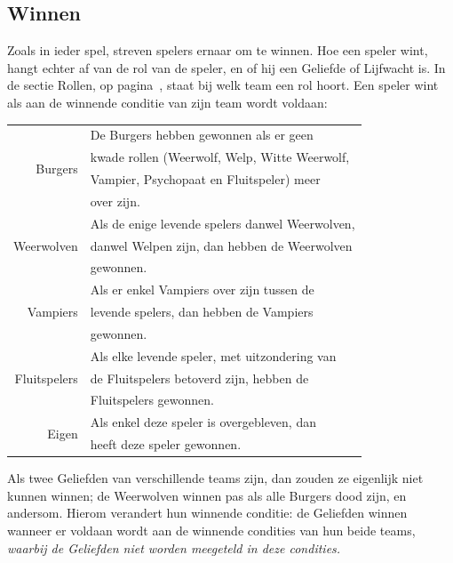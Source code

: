 \documentclass[12pt]{article}
\begin{document}
  \subsection{Winnen} \label{subsec:winnen}
  
    Zoals in ieder spel, streven spelers ernaar om te winnen. Hoe een speler wint, hangt echter af van de rol van de speler, en of hij een Geliefde of Lijfwacht is. In de sectie Rollen, op pagina~\pageref{subsec:rollen}, staat bij welk team een rol hoort. Een speler wint als aan de winnende conditie van zijn team wordt voldaan:
    
    \begin{center}
      \begin{tabular}{r|l}
	\multirow{4}{*}{Burgers}
	 & De Burgers hebben gewonnen als er geen \\
	 & kwade rollen (Weerwolf, Welp, Witte Weerwolf, \\
	 & Vampier, Psychopaat en Fluitspeler) meer \\
	 & over zijn. \\
	\hline
	\multirow{3}{*}{Weerwolven}
	 & Als de enige levende spelers danwel Weerwolven, \\
	 & danwel Welpen zijn, dan hebben de Weerwolven \\
	 & gewonnen. \\
	\hline
	\multirow{3}{*}{Vampiers}
	 & Als er enkel Vampiers over zijn tussen de \\
	 & levende spelers, dan hebben de Vampiers \\
	 & gewonnen. \\
	\hline
	\multirow{3}{*}{Fluitspelers}
	 & Als elke levende speler, met uitzondering van \\
	 & de Fluitspelers betoverd zijn, hebben de \\
	 & Fluitspelers gewonnen. \\
	\hline
	\multirow{2}{*}{Eigen} 
	 & Als enkel deze speler is overgebleven, dan \\
	 & heeft deze speler gewonnen. \\
      \end{tabular}
    \end{center}
    
    Als twee Geliefden van verschillende teams zijn, dan zouden ze eigenlijk niet kunnen winnen; de Weerwolven winnen pas als alle Burgers dood zijn, en andersom. Hierom verandert hun winnende conditie: de Geliefden winnen wanneer er voldaan wordt aan de winnende condities van hun beide teams, \emph{waarbij de Geliefden niet worden meegeteld in deze condities.}
    
\end{document}
